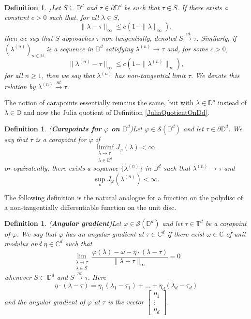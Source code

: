 \documentclass[11pt, reqno]{amsart}
\newtheorem{definition}[theorem]{Definition}
\newcommand\1{\boldsymbol {1}}
\numberwithin{equation}{section}
\begin{document}
\begin{definition}{)}\label{nontangetniallimitonDd}
Let $S\subseteq \mathbb{D}^{d}$ and $\tau \in \partial\mathbb{D}^{d}$ be such that $\tau \in \overline{S}$. If there exists a constant $c>0$ such that, for all $\lambda \in S$,
$$ \|\lambda - \tau \|_{\infty}\leq c ( 1 - \|\lambda\|_{\infty}),$$
then we say that $S$ approaches $\tau$ non-tangentially, denoted $S {\overset{nt}\rightarrow}\tau$. Similarly, if $(\lambda^{(n)})_{n\in\mathbb{N}}$ is a sequence in $\mathbb{D}^{d}$ satisfying $\lambda^{(n)} \rightarrow \tau$ and, for some $c>0$,
\begin{equation}\label{nontangentialdefpoly}
 \| \lambda^{(n)} - \tau \|_{\infty} \leq c ( 1 - \|\lambda^{(n)}\|_{\infty} ),
 \end{equation}
for all $n\geq 1$, then we say that $\lambda^{(n)}$ has non-tangential limit $\tau$. We denote this relation by $\lambda^{(n)} {\overset{nt}\rightarrow} \tau$.
\end{definition}
The notion of carapoints essentially remains the same, but with $\lambda\in\mathbb{D}^{d}$ instead of $\lambda\in\mathbb{D}$ and now the Julia quotient of Definition \ref{JuliaQuotientOnDd}.
\begin{definition}{\normalfont({\bf{Carapoints for $\varphi$ on $\mathbb{D}^{d}$}})}\label{generalizedcara}
Let $\varphi\in\mathcal{S}(\mathbb{D}^{d})$ and let $\tau\in\partial\mathbb{D}^{d}$. We say that $\tau$ is a {\em{carapoint}} for $\varphi$ if
$$\liminf_{\substack{\lambda\rightarrow\tau \\ \lambda\in\mathbb{D}^{d}}} J_{\varphi}(\lambda)<\infty,$$
or equivalently, there exists a sequence $\{\lambda^{(n)}\}$ in $\mathbb{D}^{d}$ such that $\lambda^{(n)}\rightarrow \tau$ and 
$$\sup_{n} J_{\varphi}(\lambda^{(n)})<\infty.$$
\end{definition}
The following definition is the natural analogue for a function on the polydisc of a non-tangentially differentiable function on the unit disc. 
\begin{definition}{\normalfont({\bf{Angular gradient}})}\label{angularderivative}
Let $\varphi\in\mathcal{S}(\mathbb{D}^{d})$ and let $\tau\in\mathbb{T}^{d}$ be a carapoint of $\varphi$. We say that $\varphi$ has an {\em{angular gradient}} at $\tau\in\mathbb{C}^{d}$ if there exist $\omega\in\mathbb{C}$ of unit modulus and $\eta\in\mathbb{C}^{d}$ such that
$$\lim_{\substack{\lambda\rightarrow \tau \\ \lambda\in S}}\dfrac{\varphi(\lambda)-\omega-\eta\cdot (\lambda-\tau)}{\|\lambda-\tau\|_{\infty}}=0$$
whenever $S\subset \mathbb{D}^{d}$ and $S{\overset{nt}\rightarrow}\tau$. Here
$$\eta \cdot (\lambda-\tau)=\eta_{1}(\lambda_{1}-\tau_{1})+\hdots+\eta_{d}(\lambda_{d}-\tau_{d})$$
and the {\em angular gradient} of $\varphi$ at $\tau$ is the vector $\begin{bmatrix}
    \eta_{1}\\
    \vdots\\
    \eta_{d}
\end{bmatrix}.$
\end{definition}
\end{document}

